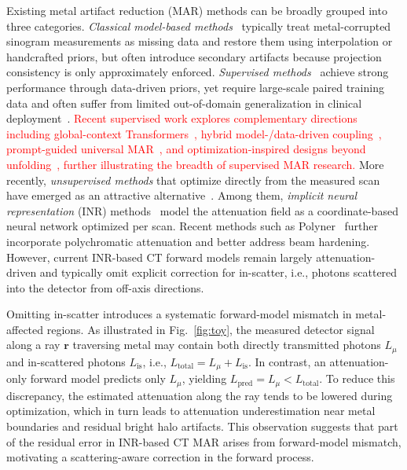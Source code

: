\documentclass[journal]{IEEEtran}
\newcommand{\vr}{\mathbf{r}}
\newcommand{\new}[1]{\textcolor{red}{#1}}  %
\begin{document}
Existing metal artifact reduction (MAR) methods can be broadly grouped into three categories. \textit{Classical model-based methods}~\cite{kalender1987reduction, meyer2010normalized, mehranian2013x} typically treat metal-corrupted sinogram measurements as missing data and restore them using interpolation or handcrafted priors, but often introduce secondary artifacts because projection consistency is only approximately enforced. \textit{Supervised methods}~\cite{zhang2018convolutional, lin2019dudonet, wang2021indudonet, su2024f2iflow, baoshun2024artifact} achieve strong performance through data-driven priors, yet require large-scale paired training data and often suffer from limited out-of-domain generalization in clinical deployment~\cite{liao2019adn, song2022solving}. \new{Recent supervised work explores complementary directions including global-context Transformers~\cite{baoshun2024artifact}, hybrid model-/data-driven coupling~\cite{shi2024coupling}, prompt-guided universal MAR~\cite{shi2025visual}, and optimization-inspired designs beyond unfolding~\cite{jiang2025optnet}, further illustrating the breadth of supervised MAR research.} More recently, \textit{unsupervised methods} that optimize directly from the measured scan have emerged as an attractive alternative~\cite{baguer2020computed, chen2025unsupervised}. Among them, \textit{implicit neural representation} (INR) methods~\cite{shen2022nerp} model the attenuation field as a coordinate-based neural network optimized per scan. Recent methods such as Polyner~\cite{wu2023unsupervised} further incorporate polychromatic attenuation and better address beam hardening. However, current INR-based CT forward models remain largely attenuation-driven and typically omit explicit correction for in-scatter, i.e., photons scattered into the detector from off-axis directions.

Omitting in-scatter introduces a systematic forward-model mismatch in metal-affected regions. As illustrated in Fig.~\ref{fig:toy}, the measured detector signal along a ray $\vr$ traversing metal may contain both directly transmitted photons $L_{\mu}$ and in-scattered photons $L_{\text{is}}$, i.e., $L_{\text{total}} = L_{\mu} + L_{\text{is}}$. In contrast, an attenuation-only forward model predicts only $L_{\mu}$, yielding $L_{\text{pred}} = L_{\mu} < L_{\text{total}}$. To reduce this discrepancy, the estimated attenuation along the ray tends to be lowered during optimization, which in turn leads to attenuation underestimation near metal boundaries and residual bright halo artifacts. This observation suggests that part of the residual error in INR-based CT MAR arises from forward-model mismatch, motivating a scattering-aware correction in the forward process.
\end{document}

